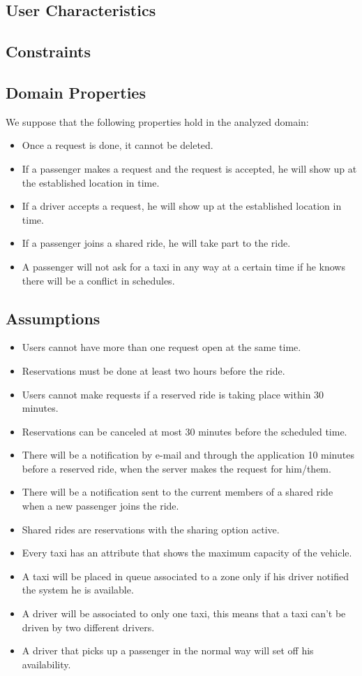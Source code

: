 \subsection{User Characteristics}

\subsection{Constraints}

\subsection{Domain Properties}
We suppose that the following properties hold in the analyzed domain:
	\begin{itemize}
		\item Once a request is done, it cannot be deleted.
		\item If a passenger makes a request and the request is accepted, he will show up at the established location in time.
		\item If a driver accepts a request, he will show up at the established location in time.
		\item If a passenger joins a shared ride, he will take part to the ride.
		\item A passenger will not ask for a taxi in any way at a certain time if he knows there will be a conflict in schedules.
	\end{itemize}
	
\subsection{Assumptions}
	\begin{itemize}
		\item Users cannot have more than one request open at the same time.
		\item Reservations must be done at least two hours before the ride.
		\item Users cannot make requests if a reserved ride is taking place within 30 minutes.
		\item Reservations can be canceled at most 30 minutes before the scheduled time.
		\item There will be a notification by e-mail and through the application 10 minutes before a reserved ride, when the server makes the request for him/them.
		\item There will be a notification sent to  the current members of a shared ride when a new passenger joins the ride.
		\item Shared rides are reservations with the sharing option active.
		\item Every taxi has an attribute that shows the maximum capacity of the vehicle.
		\item A taxi will be placed in queue associated to a zone only if his driver notified the system he is available.
		\item A driver will be associated to only one taxi, this means that a taxi can't be driven by two different drivers.
		\item A driver that picks up a passenger in the normal way will set off his availability.
	\end{itemize}

			